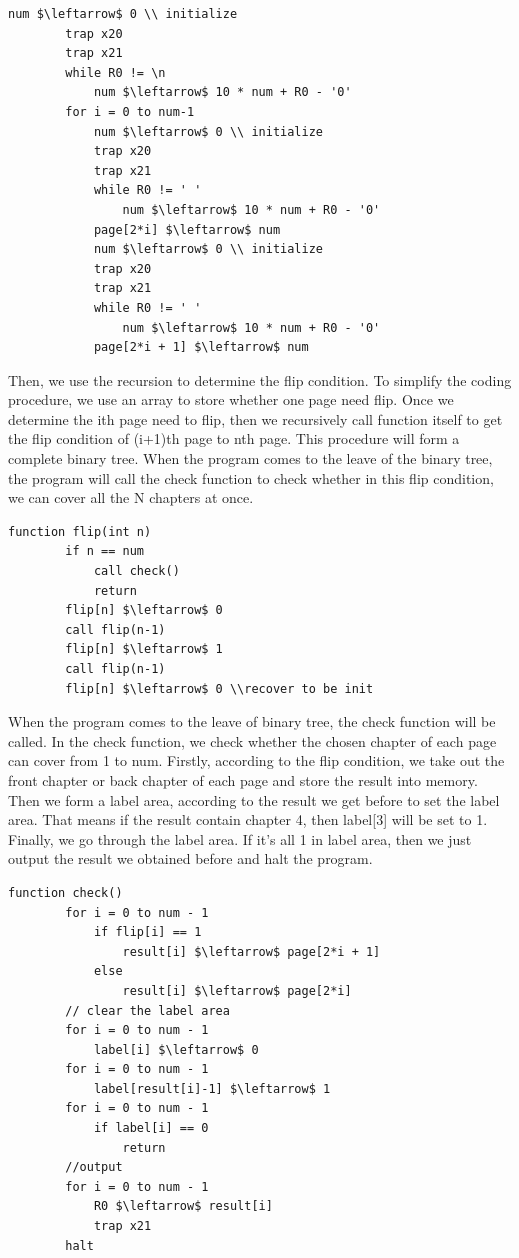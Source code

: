 \documentclass[twoside]{article}
\begin{document}
\begin{CJK*}{UTF8}{gbsn}
	\begin{lstlisting}[mathescape=true]
		num $\leftarrow$ 0 \\ initialize
		trap x20
		trap x21
		while R0 != \n
			num $\leftarrow$ 10 * num + R0 - '0'
		for i = 0 to num-1
			num $\leftarrow$ 0 \\ initialize
			trap x20
			trap x21
			while R0 != ' '
				num $\leftarrow$ 10 * num + R0 - '0'
			page[2*i] $\leftarrow$ num
			num $\leftarrow$ 0 \\ initialize
			trap x20
			trap x21
			while R0 != ' '
				num $\leftarrow$ 10 * num + R0 - '0'
			page[2*i + 1] $\leftarrow$ num			
	\end{lstlisting}
	 
	Then, we use the recursion to determine the flip condition. To simplify the coding procedure, we use an array to store whether one page need flip.
	Once we determine the ith page need to flip, then we recursively call function itself to get the flip condition of (i+1)th page to nth page. This procedure will form a complete binary tree. When the program comes to the leave of the binary tree, the program will call the check function to check whether in this flip condition, we can cover all the N chapters at once.
	
	\begin{lstlisting}[mathescape=true]
	function flip(int n) 
		if n == num
			call check()
			return
		flip[n] $\leftarrow$ 0
		call flip(n-1)
		flip[n] $\leftarrow$ 1
		call flip(n-1)
		flip[n] $\leftarrow$ 0 \\recover to be init
	\end{lstlisting}

	

	When the program comes to the leave of binary tree, the check function will be called. In the check function, we check whether the chosen chapter of each page can cover from 1 to num. Firstly, according to the flip condition, we take out the front chapter or back chapter of each page and store the result into memory. Then we form a label area, according to the result we get before to set the label area. That means if the result contain chapter 4, then label[3] will be set to 1. Finally, we go through the label area. If it's all 1 in label area, then we just output the result we obtained before and halt the program.
	
	\begin{lstlisting}[mathescape=true]
	function check() 
		for i = 0 to num - 1
			if flip[i] == 1
				result[i] $\leftarrow$ page[2*i + 1]
			else 
				result[i] $\leftarrow$ page[2*i]
		// clear the label area
		for i = 0 to num - 1
			label[i] $\leftarrow$ 0
		for i = 0 to num - 1
			label[result[i]-1] $\leftarrow$ 1
		for i = 0 to num - 1
			if label[i] == 0
				return
		//output
		for i = 0 to num - 1
			R0 $\leftarrow$ result[i]
			trap x21
		halt
	\end{lstlisting}


\end{CJK*}
\end{document}
